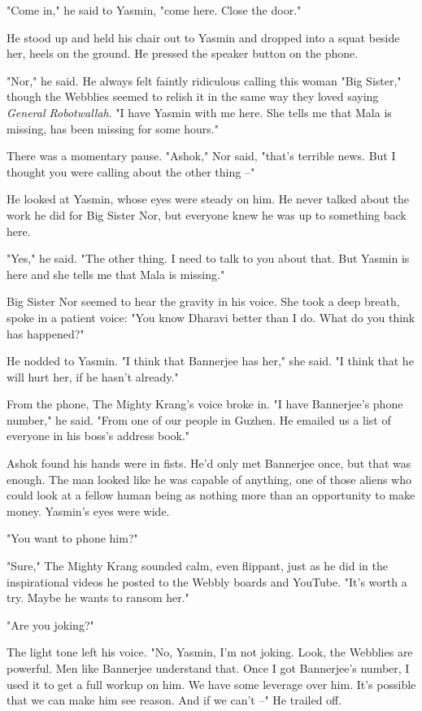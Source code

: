 "Come in," he said to Yasmin, "come here. Close the door."

He stood up and held his chair out to Yasmin and dropped into a
squat beside her, heels on the ground. He pressed the speaker
button on the phone.

"Nor," he said. He always felt faintly ridiculous calling this
woman "Big Sister," though the Webblies seemed to relish it in the
same way they loved saying \emph{General Robotwallah}. "I have
Yasmin with me here. She tells me that Mala is missing, has been
missing for some hours."

There was a momentary pause. "Ashok," Nor said, "that's terrible
news. But I thought you were calling about the other thing --"

He looked at Yasmin, whose eyes were steady on him. He never talked
about the work he did for Big Sister Nor, but everyone knew he was
up to something back here.

"Yes," he said. "The other thing. I need to talk to you about that.
But Yasmin is here and she tells me that Mala is missing."

Big Sister Nor seemed to hear the gravity in his voice. She took a
deep breath, spoke in a patient voice: "You know Dharavi better
than I do. What do you think has happened?"

He nodded to Yasmin. "I think that Bannerjee has her," she said. "I
think that he will hurt her, if he hasn't already."

From the phone, The Mighty Krang's voice broke in. "I have
Bannerjee's phone number," he said. "From one of our people in
Guzhen. He emailed us a list of everyone in his boss's address
book."

Ashok found his hands were in fists. He'd only met Bannerjee once,
but that was enough. The man looked like he was capable of
anything, one of those aliens who could look at a fellow human
being as nothing more than an opportunity to make money. Yasmin's
eyes were wide.

"You want to phone him?"

"Sure," The Mighty Krang sounded calm, even flippant, just as he
did in the inspirational videos he posted to the Webbly boards and
YouTube. "It's worth a try. Maybe he wants to ransom her."

"Are you joking?"

The light tone left his voice. "No, Yasmin, I'm not joking. Look,
the Webblies are powerful. Men like Bannerjee understand that. Once
I got Bannerjee's number, I used it to get a full workup on him. We
have some leverage over him. It's possible that we can make him see
reason. And if we can't --" He trailed off.

